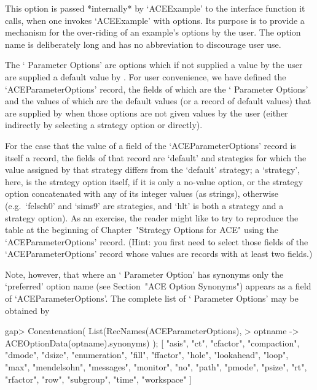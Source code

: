 This option is passed  *internally*  by  `ACEExample'  to  the  {\ACE}
interface function  it  calls,  when  one  invokes  `ACEExample'  with
options. Its purpose is to provide a mechanism for the over-riding  of
an example's options by the user. The option name is deliberately long
and has no abbreviation to discourage user use.

\enditems


The \lq{}{\ACE} Parameter Options' are options which if not supplied a
value by the user are supplied a default value  by  {\ACE}.  For  user
convenience, we  have  defined  the  `ACEParameterOptions'{\undoquotes
{}}   record,   the
fields of which are the \lq{}{\ACE} Parameter Options' and the  values
of which are the default  values  (or  a  record  of  default  values)
that are supplied by {\ACE} when those options are not given values by
the  user  (either  indirectly  by  selecting  a  strategy  option  or
directly).

For the case that the value of a field  of  the  `ACEParameterOptions'
record is itself a record, the fields of that record are `default' and
strategies for which the value assigned by that strategy differs  from
the `default' strategy; a \lq{}strategy', here, is the strategy option
itself, if it is only  a  no-value  option,  or  the  strategy  option
concatenated with any of its integer values  (as  strings),  otherwise
(e.g.~`felsch0' and `sims9'  are  strategies,  and  `hlt'  is  both  a
strategy and a strategy option). As an exercise, the reader might like
to try to reproduce the table at the  beginning  of  Chapter~"Strategy
Options for ACE" using the `ACEParameterOptions'  record.  (Hint:  you
first need to select those fields of the `ACEParameterOptions'  record
whose values are records with at least two fields.)

Note,  however,  that  where  an  \lq{}{\ACE}  Parameter  Option'  has
synonyms only the \lq{}preferred' option name (see Section~"ACE Option
Synonyms") appears as a field of `ACEParameterOptions'.  The  complete
list of \lq{}{\ACE} Parameter Options' may be obtained by

\beginexample
gap> Concatenation( List(RecNames(ACEParameterOptions),                    
>                        optname -> ACEOptionData(optname).synonyms) ); 
[ "asis", "ct", "cfactor", "compaction", "dmode", "dsize", "enumeration", 
  "fill", "ffactor", "hole", "lookahead", "loop", "max", "mendelsohn", 
  "messages", "monitor", "no", "path", "pmode", "psize", "rt", "rfactor", 
  "row", "subgroup", "time", "workspace" ]
\endexample


